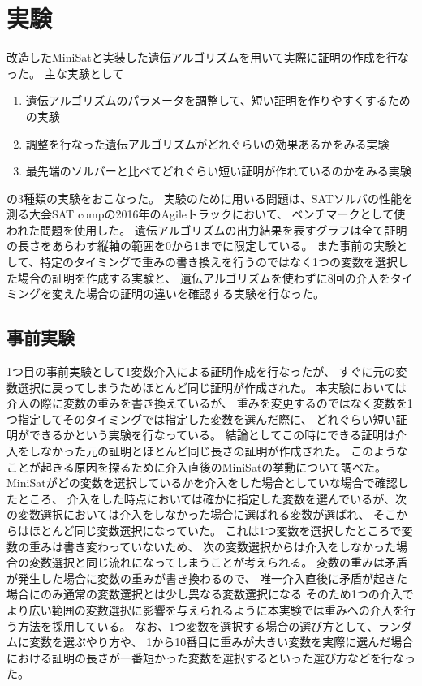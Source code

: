 \section{実験}

改造したMiniSatと実装した遺伝アルゴリズムを用いて実際に証明の作成を行なった。
主な実験として
\begin{enumerate}
    \item 遺伝アルゴリズムのパラメータを調整して、短い証明を作りやすくするための実験
    \item 調整を行なった遺伝アルゴリズムがどれぐらいの効果あるかをみる実験
    \item 最先端のソルバーと比べてどれぐらい短い証明が作れているのかをみる実験
\end{enumerate}
の3種類の実験をおこなった。
実験のために用いる問題は、SATソルバの性能を測る大会SAT compの2016年のAgileトラックにおいて、
ベンチマークとして使われた問題を使用した。
遺伝アルゴリズムの出力結果を表すグラフは全て証明の長さをあらわす縦軸の範囲を0から1までに限定している。
また事前の実験として、特定のタイミングで重みの書き換えを行うのではなく1つの変数を選択した場合の証明を作成する実験と、
遺伝アルゴリズムを使わずに8回の介入をタイミングを変えた場合の証明の違いを確認する実験を行なった。



\setcounter{subsection}{-1} %



\subsection{事前実験}

1つ目の事前実験として1変数介入による証明作成を行なったが、
すぐに元の変数選択に戻ってしまうためほとんど同じ証明が作成された。
本実験においては介入の際に変数の重みを書き換えているが、
重みを変更するのではなく変数を1つ指定してそのタイミングでは指定した変数を選んだ際に、
どれぐらい短い証明ができるかという実験を行なっている。
結論としてこの時にできる証明は介入をしなかった元の証明とほとんど同じ長さの証明が作成された。
このようなことが起きる原因を探るために介入直後のMiniSatの挙動について調べた。
MiniSatがどの変数を選択しているかを介入をした場合としていな場合で確認したところ、
介入をした時点においては確かに指定した変数を選んでいるが、次の変数選択においては介入をしなかった場合に選ばれる変数が選ばれ、
そこからはほとんど同じ変数選択になっていた。
これは1つ変数を選択したところで変数の重みは書き変わっていないため、
次の変数選択からは介入をしなかった場合の変数選択と同じ流れになってしまうことが考えられる。
変数の重みは矛盾が発生した場合に変数の重みが書き換わるので、
唯一介入直後に矛盾が起きた場合にのみ通常の変数選択とは少し異なる変数選択になる
そのため1つの介入でより広い範囲の変数選択に影響を与えられるように本実験では重みへの介入を行う方法を採用している。
なお、1つ変数を選択する場合の選び方として、ランダムに変数を選ぶやり方や、
1から10番目に重みが大きい変数を実際に選んだ場合における証明の長さが一番短かった変数を選択するといった選び方などを行なった。


